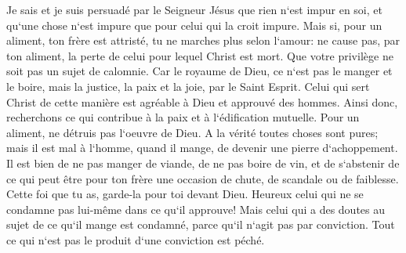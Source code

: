 \verse Je sais et je suis persuadé par le Seigneur Jésus que rien n`est impur en soi, et qu`une chose n`est impure que pour celui qui la croit impure. 
\verse Mais si, pour un aliment, ton frère est attristé, tu ne marches plus selon l`amour: ne cause pas, par ton aliment, la perte de celui pour lequel Christ est mort. 
\verse Que votre privilège ne soit pas un sujet de calomnie. 
\verse Car le royaume de Dieu, ce n`est pas le manger et le boire, mais la justice, la paix et la joie, par le Saint Esprit. 
\verse Celui qui sert Christ de cette manière est agréable à Dieu et approuvé des hommes. 
\verse Ainsi donc, recherchons ce qui contribue à la paix et à l`édification mutuelle. 
\verse Pour un aliment, ne détruis pas l`oeuvre de Dieu. A la vérité toutes choses sont pures; mais il est mal à l`homme, quand il mange, de devenir une pierre d`achoppement. 
\verse Il est bien de ne pas manger de viande, de ne pas boire de vin, et de s`abstenir de ce qui peut être pour ton frère une occasion de chute, de scandale ou de faiblesse. 
\verse Cette foi que tu as, garde-la pour toi devant Dieu. Heureux celui qui ne se condamne pas lui-même dans ce qu`il approuve! 
\verse Mais celui qui a des doutes au sujet de ce qu`il mange est condamné, parce qu`il n`agit pas par conviction. Tout ce qui n`est pas le produit d`une conviction est péché. 

